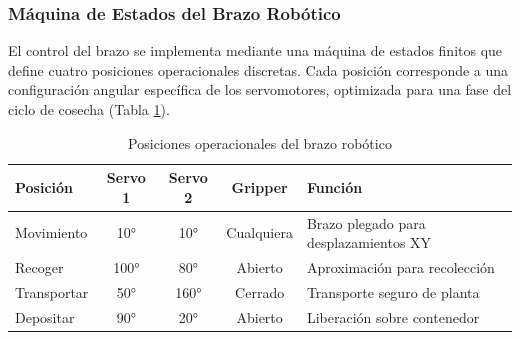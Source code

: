 \subsubsection{Máquina de Estados del Brazo Robótico}

El control del brazo se implementa mediante una máquina de estados finitos que define cuatro posiciones operacionales discretas. Cada posición corresponde a una configuración angular específica de los servomotores, optimizada para una fase del ciclo de cosecha (Tabla \ref{tab:estados_brazo}).

\begin{table}[H]
\centering
\small
\begin{tabular}{|l|c|c|c|p{4.5cm}|}
\hline
\textbf{Posición} & \textbf{Servo 1} & \textbf{Servo 2} & \textbf{Gripper} & \textbf{Función} \\
\hline
Movimiento & 10° & 10° & Cualquiera & Brazo plegado para desplazamientos XY \\
\hline
Recoger & 100° & 80° & Abierto & Aproximación para recolección \\
\hline
Transportar & 50° & 160° & Cerrado & Transporte seguro de planta \\
\hline
Depositar & 90° & 20° & Abierto & Liberación sobre contenedor \\
\hline
\end{tabular}
\caption{Posiciones operacionales del brazo robótico}
\label{tab:estados_brazo}
\end{table}

